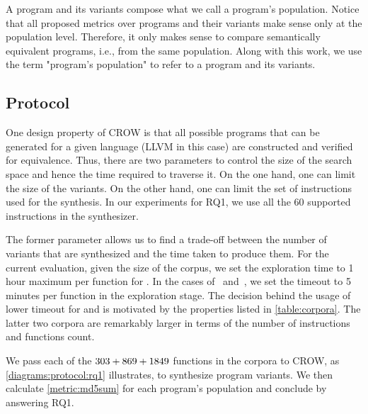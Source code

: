 A program and its variants compose what we call a program's population. Notice that all proposed metrics over programs and their variants make sense only at the population level. Therefore, it only makes sense to compare semantically equivalent programs, i.e., from the same population. Along with this work, we use the term "program's population" to refer to a program and its variants.

\subsection{Protocol}



One design property of CROW is that all possible programs that can be generated for a given language (LLVM in this case) are constructed and verified for equivalence. Thus, there are two parameters to control the size of the search space and hence the time required to traverse it.
On the one hand, one can limit the size of the variants. On the other hand, one can limit the set of instructions used for the synthesis. In our experiments for RQ1, we use all the $60$ supported instructions in the synthesizer.

The former parameter allows us to find a trade-off between the number of variants that are synthesized and the time taken to produce them. For the current evaluation, given the size of the corpus, we set the exploration time to 1 hour maximum per function for \corpusrosetta. In the cases of \corpussodium\ and\ \corpusqrcode, we set the timeout to 5 minutes per function in the exploration stage. The decision behind the usage of lower timeout for \corpussodium
and \corpussodium is motivated by the properties listed in \autoref{table:corpora}. The latter two corpora are remarkably larger in terms of the number of instructions and functions count. 

We pass each of the $303 + 869 + 1849$ functions in the corpora to CROW, as \autoref{diagrams:protocol:rq1} illustrates, to synthesize program variants. We then calculate \autoref{metric:md5sum} for each program's population and conclude by answering RQ1.
